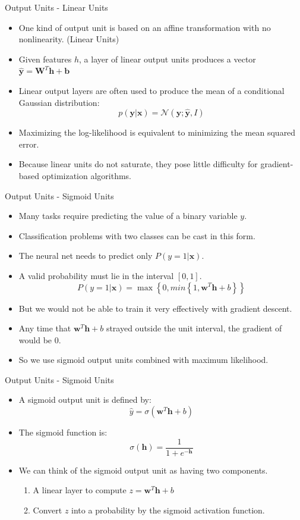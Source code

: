 \documentclass[10pt]{beamer}
\begin{document}
	\begin{frame}{Output Units - Linear Units}
		\begin{itemize}
			\item One kind of output unit is based on an affine transformation with no nonlinearity. (Linear Units)
			\item Given features $h$, a layer of linear output units produces a vector $\hat{\bm{y}}=\bm{W}^T\bm{h}+\bm{b}$
			\item Linear output layers are often used to produce the mean of a conditional Gaussian distribution:
			$$p(\bm{y}|\bm{x})=\mathcal{N}(\bm{y};\hat{\bm{y}},\mathit{I})$$
			\item Maximizing the log-likelihood is equivalent to minimizing the mean squared error.
			\item Because linear units do not saturate, they pose little difficulty for gradient-based optimization algorithms.
		\end{itemize}
	\end{frame}

	\begin{frame}{Output Units - Sigmoid Units}
		\begin{itemize}
			\item Many tasks require predicting the value of a binary variable $y$.
			\item Classification problems with two classes can be cast in this form.
			\item The neural net needs to predict only $P(y=1|\bm{x})$.
			\item A valid probability must lie in the interval $[0, 1]$.
			$$P(y=1|\bm{x})=\max\left\{0,min\left\{1,\bm{w}^T\bm{h}+b\right\}\right\}$$
			\item But we would not be able to train it very effectively with gradient descent.
			\item Any time that $\bm{w}^T\bm{h}+b$ strayed outside the unit interval, the gradient of would be 0.
			\item So we use sigmoid output units combined with maximum likelihood.
		\end{itemize}
	\end{frame}

	\begin{frame}{Output Units - Sigmoid Units}
		\begin{itemize}
			\item A sigmoid output unit is defined by:
			$$\hat{y}=\sigma(\bm{w}^T\bm{h}+b)$$
			\item The sigmoid function is:
			$$\sigma(\bm{h})=\frac{1}{1+e^{-\bm{h}}}$$
			\item We can think of the sigmoid output unit as having two components.
			\begin{enumerate}
				\item A linear layer to compute $z=\bm{w}^T\bm{h}+b$
				\item Convert $z$ into a probability by the sigmoid activation function.
			\end{enumerate}
		\end{itemize}
	\end{frame}
\end{document}
